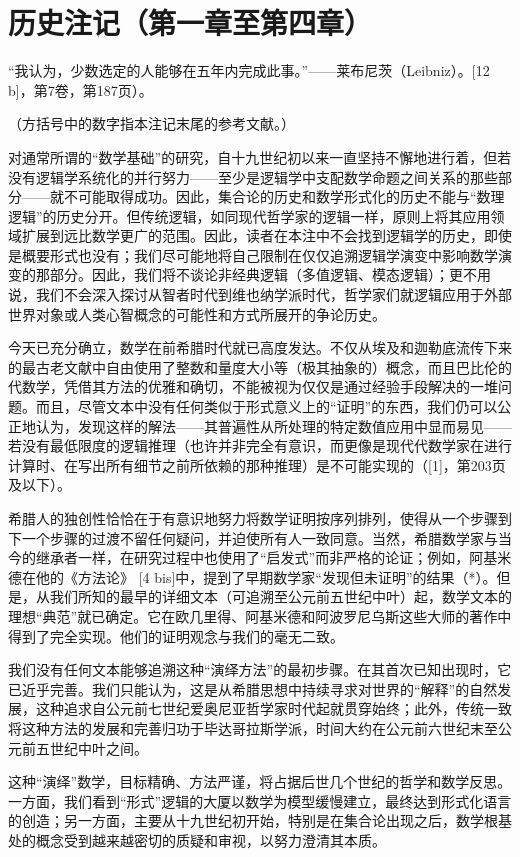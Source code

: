 \section*{历史注记（第一章至第四章）}
{}

“我认为，少数选定的人能够在五年内完成此事。”——莱布尼茨（Leibniz）。{[}12 b{]}，第7卷，第187页）。

（方括号中的数字指本注记末尾的参考文献。）

对通常所谓的“数学基础”的研究，自十九世纪初以来一直坚持不懈地进行着，但若没有逻辑学系统化的并行努力——至少是逻辑学中支配数学命题之间关系的那些部分——就不可能取得成功。因此，集合论的历史和数学形式化的历史不能与“数理逻辑”的历史分开。但传统逻辑，如同现代哲学家的逻辑一样，原则上将其应用领域扩展到远比数学更广的范围。因此，读者在本注中不会找到逻辑学的历史，即使是概要形式也没有；我们尽可能地将自己限制在仅仅追溯逻辑学演变中影响数学演变的那部分。因此，我们将不谈论非经典逻辑（多值逻辑、模态逻辑）；更不用说，我们不会深入探讨从智者时代到维也纳学派时代，哲学家们就逻辑应用于外部世界对象或人类心智概念的可能性和方式所展开的争论历史。

今天已充分确立，数学在前希腊时代就已高度发达。不仅从埃及和迦勒底流传下来的最古老文献中自由使用了整数和量度大小等（极其抽象的）概念，而且巴比伦的代数学，凭借其方法的优雅和确切，不能被视为仅仅是通过经验手段解决的一堆问题。而且，尽管文本中没有任何类似于形式意义上的“证明”的东西，我们仍可以公正地认为，发现这样的解法——其普遍性从所处理的特定数值应用中显而易见——若没有最低限度的逻辑推理（也许并非完全有意识，而更像是现代代数学家在进行计算时、在写出所有细节之前所依赖的那种推理）是不可能实现的（{[}1{]}，第203页及以下）。

希腊人的独创性恰恰在于有意识地努力将数学证明按序列排列，使得从一个步骤到下一个步骤的过渡不留任何疑问，并迫使所有人一致同意。当然，希腊数学家与当今的继承者一样，在研究过程中也使用了“启发式”而非严格的论证；例如，阿基米德在他的《方法论》 {[}4 bis{]}中，提到了早期数学家“发现但未证明”的结果（*）。但是，从我们所知的最早的详细文本（可追溯至公元前五世纪中叶）起，数学文本的理想“典范”就已确定。它在欧几里得、阿基米德和阿波罗尼乌斯这些大师的著作中得到了完全实现。他们的证明观念与我们的毫无二致。

我们没有任何文本能够追溯这种“演绎方法”的最初步骤。在其首次已知出现时，它已近乎完善。我们只能认为，这是从希腊思想中持续寻求对世界的“解释”的自然发展，这种追求自公元前七世纪爱奥尼亚哲学家时代起就贯穿始终；此外，传统一致将这种方法的发展和完善归功于毕达哥拉斯学派，时间大约在公元前六世纪末至公元前五世纪中叶之间。

这种“演绎”数学，目标精确、方法严谨，将占据后世几个世纪的哲学和数学反思。一方面，我们看到“形式”逻辑的大厦以数学为模型缓慢建立，最终达到形式化语言的创造；另一方面，主要从十九世纪初开始，特别是在集合论出现之后，数学根基处的概念受到越来越密切的质疑和审视，以努力澄清其本质。

